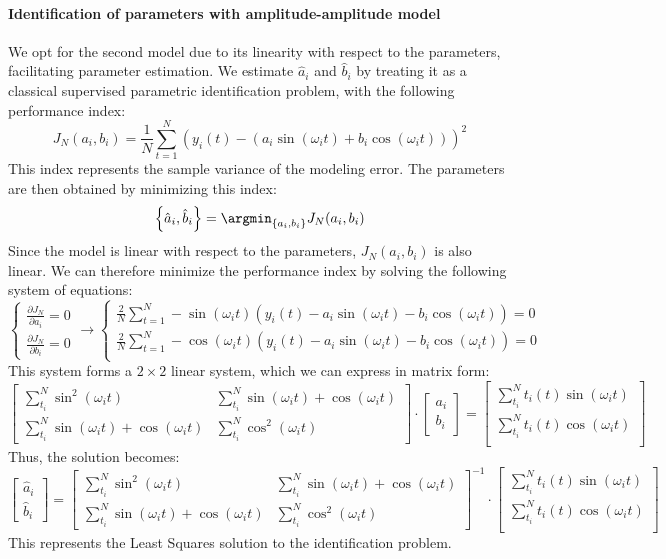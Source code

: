 \paragraph*{Identification of parameters with amplitude-amplitude model}
We opt for the second model due to its linearity with respect to the parameters, facilitating parameter estimation.
We estimate $\hat{a}_i$ and $\hat{b}_i$ by treating it as a classical supervised parametric identification problem, with the following performance index:
\[J_N(a_i,b_i)=\dfrac{1}{N}\sum_{t=1}^N\left(y_i(t)-\left(a_i\sin(\omega_it)+b_i\cos(\omega_it)\right)\right)^2\]
This index represents the sample variance of the modeling error. 
The parameters are then obtained by minimizing this index:
\[\left\{\hat{a}_i,\hat{b}_i\right\}=\argmin_{\left\{a_i,b_i\right\}}J_N(a_i,b_i)\]
Since the model is linear with respect to the parameters, $J_N(a_i,b_i)$ is also linear. 
We can therefore minimize the performance index by solving the following system of equations:
\[\begin{cases} \frac{\partial J_N}{\partial a_i}=0 \\ \frac{\partial J_N}{\partial b_i}=0 \end{cases}\rightarrow\begin{cases} \frac{2}{N}\sum_{t=1}^{N}-\sin(\omega_it)\left(y_i(t)-a_i\sin(\omega_it)-b_i\cos(\omega_it)\right)=0 \\ \frac{2}{N}\sum_{t=1}^{N}-\cos(\omega_it)\left(y_i(t)-a_i\sin(\omega_it)-b_i\cos(\omega_it)\right)=0 \\ \end{cases}\]
This system forms a $2 \times 2$ linear system, which we can express in matrix form:
\[\begin{bmatrix} \sum_{t_i}^N \sin^2(\omega_it) & \sum_{t_i}^N \sin(\omega_it)+\cos(\omega_it) \\ \sum_{t_i}^N \sin(\omega_it)+\cos(\omega_it) & \sum_{t_i}^N \cos^2(\omega_it) \end{bmatrix}\cdot\begin{bmatrix} a_i \\ b_i \end{bmatrix}=\begin{bmatrix} \sum_{t_i}^N t_i(t)\sin(\omega_it) \\ \sum_{t_i}^N t_i(t)\cos(\omega_it) \\ \end{bmatrix}\]
Thus, the solution becomes:
\[\begin{bmatrix} \hat{a}_i \\ \hat{b}_i \end{bmatrix}=\begin{bmatrix} \sum_{t_i}^N \sin^2(\omega_it) & \sum_{t_i}^N \sin(\omega_it)+\cos(\omega_it) \\ \sum_{t_i}^N \sin(\omega_it)+\cos(\omega_it) & \sum_{t_i}^N \cos^2(\omega_it) \end{bmatrix}^{-1}\cdot\begin{bmatrix} \sum_{t_i}^N t_i(t)\sin(\omega_it) \\ \sum_{t_i}^N t_i(t)\cos(\omega_it) \\ \end{bmatrix}\]
This represents the Least Squares solution to the identification problem.


